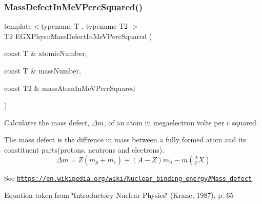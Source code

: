 \subsubsection{\texorpdfstring{Mass\+Defect\+In\+Me\+V\+Perc\+Squared()}{MassDefectInMeVPercSquared()}}
{\footnotesize\ttfamily template$<$typename T , typename T2 $>$ \\
T2 E\+G\+X\+Phys\+::\+Mass\+Defect\+In\+Me\+V\+Perc\+Squared (\begin{DoxyParamCaption}\item[{const T \&}]{atomic\+Number,  }\item[{const T \&}]{mass\+Number,  }\item[{const T2 \&}]{mass\+Atom\+In\+Me\+V\+Perc\+Squared }\end{DoxyParamCaption})}



Calculates the mass defect, $\Delta m$, of an atom in megaelectron volts per c squared. 

The mass defect is the diffrence in mass between a fully formed atom and its constituent parts(protons, neutrons and electrons). \[\Delta m = Z(m_p + m_e)+(A-Z)m_n - m({^A_ZX})\]

See \href{https://en.wikipedia.org/wiki/Nuclear_binding_energy#Mass_defect}{\tt https\+://en.\+wikipedia.\+org/wiki/\+Nuclear\+\_\+binding\+\_\+energy\#\+Mass\+\_\+defect}

Equation taken from \char`\"{}\+Introductory Nuclear Physics\char`\"{} (Krane, 1987), p. 65


